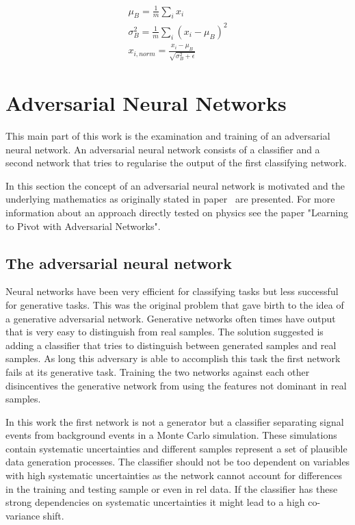 \begin{align}
    \mu_B = \frac{1}{m} \sum_i x_i\\
    \sigma_B^2 = \frac{1}{m} \sum_i (x_i - \mu_B)^2\\
    x_{i,norm} = \frac{x_i - \mu_B}{\sqrt{\sigma_B^2 + \epsilon}}
\end{align}





\section{Adversarial Neural Networks}

This main part of this work is the examination and training of an adversarial neural network. An adversarial neural network consists of a classifier and a second network that tries to regularise the output of the first classifying network.

In this section the concept of an adversarial neural network is motivated and the underlying mathematics as originally stated in paper~\cite{2014arXiv1406.2661G} are presented.
For more information about an approach directly tested on physics see the paper "Learning to Pivot with Adversarial Networks".~\cite{Louppe:2016ylz}

\subsection{The adversarial neural network}

Neural networks have been very efficient for classifying tasks but less successful for generative tasks. This was the original problem that gave birth to the idea of a generative adversarial network. Generative networks often times have output that is very easy to distinguish from real samples. The solution suggested is adding a classifier that tries to distinguish between generated samples and real samples. As long this adversary is able to accomplish this task the first network fails at its generative task. Training the two networks against each other disincentives the generative network from using the features not dominant in real samples.

In this work the first network is not a generator but a classifier separating signal events from background events in a Monte Carlo simulation. These simulations contain systematic uncertainties and different samples represent a set of plausible data generation processes. The classifier should not be too dependent on variables with high systematic uncertainties as the network cannot account for differences in the training and testing sample or even in rel data. If the classifier has these strong dependencies on systematic uncertainties it might lead to a high co-variance shift.

